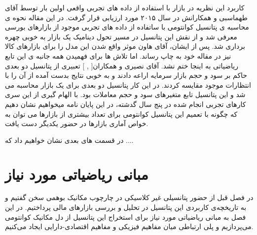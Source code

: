 \documentclass[a4paper,titlepage,12pt,fleqn,oneside]{report}
\begin{document}
  کاربرد این نظریه در بازار با استفاده از داده های تجربی واقعی اولین بار توسط آقای طهماسبی و همکارانش\cite{tahmaseb} در سال ۲۰۱۵ مورد ارزیابی قرار گرفت. در این مقاله نحوه ی محاسبه ی پتانسیل کوانتومی با ساتفاده از داده های تجربی موجود از بازارهای بورسی معرفی شد و از نقش این پتانسیل در مسیر تحول دینامیک یک بازار به خوبی چهره برداری شد. پس از ایشان، آقای هاون موثر واقع شدن این مدل را برای بازارهای کالا نیز در مقاله خود به چاپ رساند\cite{shen}. اما تلاش ها برای فهمیدن همه جانبه ی این تابع ریاضیاتی به اینجا ختم نشد. آقای نصیری و همکاران[ , ] تعبیری از پتانسیل دو بعدی حاکم بر سود و حجم بازار سرمایه اراعه دادند و به خوبی نتایج بدست آمده از آن را با انتظارات موجود مقایسه کردند. در این کار پتانسیل دو بعدی برای یک بازار محاسبه می شد و این پتانسیل تابع متغیرهای سود و حجم معاملات بود. با الهام گیری از این سری کارهای تجربی انجام شده در پنج سال گدشته، در این پایان نامه میخواهیم نشان دهیم که چگونه با تعمیم این پتانسیل کوانتومی برای تعداد بیشتری از بازارها می توان به خواص آماری بازارها در حضور یکدیگر دست یافت. 
  
  در قسمت های بعدی نشان خواهیم داد که ....
  
  


\chapter{مبانی ریاضیاتی مورد نیاز}
در فصل قبل از حضور پتانسیلی غیر کلاسیکی در چارچوب مکانیک بوهمی سخن گفتیم و به تاریخچه‌ی کاربردی این پتانسیل در تحلیل و بررسی بازارهای مالی پرداختیم. در این فصل به مبانی ریاضیاتی مورد نیاز برای استخراج این پتانسیل از دل مکانیک کوانتومی می‌پردازیم و پلی ارتباطی میان مفاهیم فیزیکی و مفاهیم اقتصادی-دارایی ایجاد می‌کنیم. 
 
\end{document}
